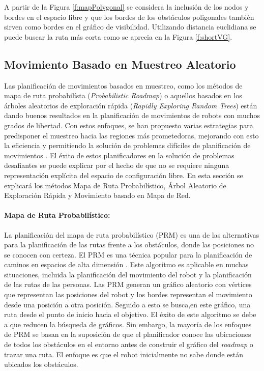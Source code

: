 A partir de la Figura \ref{f:mapPolygonal} se considera la inclusión de 
los nodos y bordes en el espacio libre y que los bordes de los obstáculos 
poligonales también sirven como bordes en el gráfico de 
visibilidad. Utilizando distancia euclidiana se puede buscar la ruta más 
corta como se aprecia en la Figura \ref{f:shortVG}.

\subsection{Movimiento Basado en Muestreo Aleatorio}

Las planificación de movimientos basados en muestreo, como los métodos 
de mapa de ruta probabilísta (\textit{Probabilistic Roadmap}) o aquellos 
basados en los árboles aleatorios de exploración rápida 
(\textit{Rapidly Exploring Random Trees}) están dando buenos resultados 
en la planificación de movimientos de robots con muchos grados de 
libertad. Con estos enfoques, se han propuesto varias estrategias para 
predisponer el muestreo hacia las regiones más prometedoras, mejorando 
con esto la eficiencia y permitiendo la solución de problemas difíciles 
de planificación de movimientos \cite{elbanhawi2014sampling}. El éxito 
de estos planificadores en la solución de problemas desafiantes se puede 
explicar por el hecho de que no se requiere ninguna representación 
explícita del espacio de configuración libre. En esta sección se 
explicará los métodos Mapa de Ruta Probabilístico, Árbol Aleatorio de 
Exploración Rápida y Movimiento basado en Mapa de Red.
\paragraph{Mapa de Ruta Probabilístico:} %

La planificaci\'on del mapa de ruta probabil\'istico (PRM) es una de las 
alternativas para la planificaci\'on de las rutas frente a los  
obst\'aculos, donde las posiciones no se conocen con certeza. El PRM es una 
t\'ecnica popular para la planificaci\'on de caminos en espacios de alta 
dimensi\'on \cite{guibas1999probabilistic}. Este algoritmo es aplicable 
en muchas situaciones, incluida la planificaci\'on del movimiento del 
robot y la planificaci\'on de las rutas de las personas. Las PRM generan 
un gr\'afico aleatorio con v\'ertices que representan las posiciones del 
robot y los bordes representan el movimiento desde una posici\'on a otra 
posici\'on. Seguido a esto se busca,en este gr\'afico, una ruta desde el 
punto de inicio hacia el objetivo. El \'exito de este algoritmo se debe 
a que reducen la b\'usqueda de gr\'aficos. Sin embargo, la mayor\'ia de 
los enfoques de PRM se basan en la suposici\'on de que el planificador 
conoce las ubicaciones de todos los obst\'aculos en el entorno antes de 
construir el gr\'afico del \textit{roadmap} o trazar una ruta. El enfoque 
es que el robot inicialmente no sabe donde est\'an ubicados los obst\'aculos.

